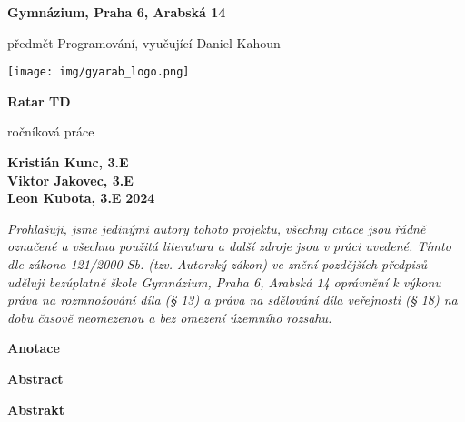 \documentclass{article}[12pt]
\begin{document}
\onehalfspacing

\begin{titlepage}
	\centering

	{\LARGE\bfseries Gymnázium, Praha 6, Arabská 14\par}
	{\large předmět Programování, vyučující Daniel Kahoun}

	\vspace{4cm}
	\texttt{[image: img/gyarab\_logo.png]} \par\vspace{1cm}
	\vspace{0.5cm}

	{\Huge\bfseries Ratar TD\par}
	\vspace{0.2cm}
	{\huge ročníková práce}

	\vfill

	\begin{flushleft}
		\textbf{\large Kristián Kunc, 3.E} \\
		\textbf{\large Viktor Jakovec, 3.E} \\
		\textbf{\large Leon Kubota, 3.E} \hfill \textbf{\large 2024}
	\end{flushleft}



\end{titlepage}

\newpage
\thispagestyle{empty}
\vspace*{\fill}

\noindent \emph{Prohlašuji, jsme jedinými autory  tohoto projektu, všechny citace jsou řádně označené a všechna použitá literatura a další zdroje jsou v práci uvedené.
	Tímto dle zákona 121/2000 Sb. (tzv. Autorský zákon) ve znění pozdějších předpisů uděluji
	bezúplatně škole Gymnázium, Praha 6, Arabská 14 oprávnění k výkonu práva na rozmnožování díla
	(§ 13) a práva na sdělování díla veřejnosti (§ 18) na dobu časově neomezenou a bez omezení
	územního rozsahu.}

\vspace{1cm}
\hfill \dotfill
\pagebreak


\textbf{{\Large Anotace}} \linebreak

\vspace{1cm}
\textbf{{\Large Abstract}}\linebreak

\vspace{1cm}
\textbf{{\Large Abstrakt}}\linebreak
\end{document}
